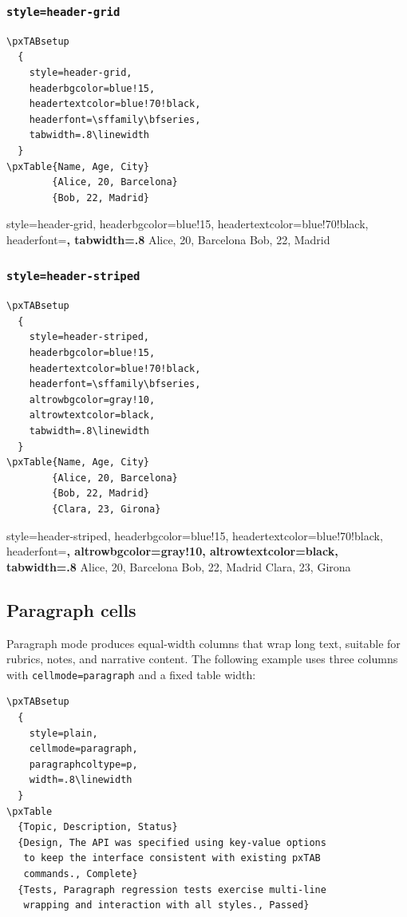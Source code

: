 \documentclass[11pt,a4paper]{article}
\begin{document}
\subsubsection*{\texttt{style=header-grid}}

\begin{verbatim}
\pxTABsetup
  {
    style=header-grid,
    headerbgcolor=blue!15,
    headertextcolor=blue!70!black,
    headerfont=\sffamily\bfseries,
    tabwidth=.8\linewidth
  }
\pxTable{Name, Age, City}
        {Alice, 20, Barcelona}
        {Bob, 22, Madrid}
\end{verbatim}

\pxTABsetup
  {
    style=header-grid,
    headerbgcolor=blue!15,
    headertextcolor=blue!70!black,
    headerfont=\sffamily\bfseries,
    tabwidth=.8\linewidth
  }
        {Alice, 20, Barcelona}
        {Bob, 22, Madrid}

\subsubsection*{\texttt{style=header-striped}}

\begin{verbatim}
\pxTABsetup
  {
    style=header-striped,
    headerbgcolor=blue!15,
    headertextcolor=blue!70!black,
    headerfont=\sffamily\bfseries,
    altrowbgcolor=gray!10,
    altrowtextcolor=black,
    tabwidth=.8\linewidth
  }
\pxTable{Name, Age, City}
        {Alice, 20, Barcelona}
        {Bob, 22, Madrid}
        {Clara, 23, Girona}
\end{verbatim}

\pxTABsetup
  {
    style=header-striped,
    headerbgcolor=blue!15,
    headertextcolor=blue!70!black,
    headerfont=\sffamily\bfseries,
    altrowbgcolor=gray!10,
    altrowtextcolor=black,
    tabwidth=.8\linewidth
  }
        {Alice, 20, Barcelona}
        {Bob, 22, Madrid}
        {Clara, 23, Girona}

\subsection{Paragraph cells}

Paragraph mode produces equal-width columns that wrap long text,
suitable for rubrics, notes, and narrative content.  The following
example uses three columns with \texttt{cellmode=paragraph} and a
fixed table width:

\begin{verbatim}
\pxTABsetup
  {
    style=plain,
    cellmode=paragraph,
    paragraphcoltype=p,
    width=.8\linewidth
  }
\pxTable
  {Topic, Description, Status}
  {Design, The API was specified using key-value options
   to keep the interface consistent with existing pxTAB
   commands., Complete}
  {Tests, Paragraph regression tests exercise multi-line
   wrapping and interaction with all styles., Passed}
\end{verbatim}
\end{document}

